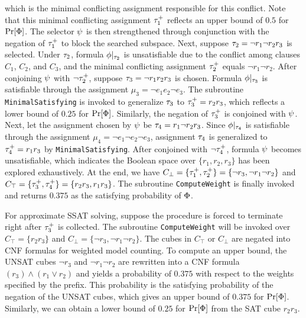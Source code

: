 \begin{example}
    which is the minimal conflicting assignment responsible for this conflict.
    Note that this minimal conflicting assignment $\tau_1^+$ reflects an upper bound of $0.5$ for $\Pr[\Phi]$.
    The selector $\psi$ is then strengthened through conjunction with the negation of $\tau_1^+$ to block the searched subspace.
    Next, suppose $\tau_2=\lnot r_1 \lnot r_2 r_3$ is selected.
    Under $\tau_2$,
    formula $\phi|_{\tau_2}$ is unsatisfiable due to the conflict among clauses $C_1$, $C_2$, and $C_3$,
    and the minimal conflicting assignment $\tau_2^+$ equals $\lnot r_1 \lnot r_2$.
    After conjoining $\psi$ with $\lnot \tau_2^+$, suppose $\tau_3=\lnot r_1 r_2 r_3$ is chosen.
    Formula $\phi|_{\tau_3}$ is satisfiable through the assignment $\mu_3=\lnot e_1 e_2 \lnot e_3$.
    The subroutine \texttt{MinimalSatisfying} is invoked to generalize $\tau_3$ to $\tau_3^+=r_2r_3$,
    which reflects a lower bound of $0.25$ for $\Pr[\Phi]$.
    Similarly, the negation of $\tau_3^+$ is conjoined with $\psi$.
    Next, let the assignment chosen by $\psi$ be $\tau_4=r_1 \lnot r_2 r_3$.
    Since $\phi|_{\tau_4}$ is satisfiable through the assignment $\mu_4=\lnot e_1 \lnot e_2 \lnot e_3$,
    assignment $\tau_4$ is generalized to $\tau_4^+=r_1r_3$ by \texttt{MinimalSatisfying}.
    After conjoined with $\lnot \tau_4^+$,
    formula $\psi$ becomes unsatisfiable,
    which indicates the Boolean space over $\{r_1,r_2,r_3\}$ has been explored exhaustively.
    At the end, we have
    $C_\bot=\{\tau_1^+,\tau_2^+\}=\{\lnot r_3,\lnot r_1 \lnot r_2\}$ and
    $C_\top=\{\tau_3^+,\tau_4^+\}=\{r_2r_3,r_1r_3\}$.
    The subroutine \texttt{ComputeWeight} is finally invoked and returns $0.375$ as the satisfying probability of $\Phi$.

    For approximate SSAT solving, suppose the procedure is forced to terminate right after $\tau_3^+$ is collected.
    The subroutine \texttt{ComputeWeight} will be invoked over $C_\top=\{r_2r_3\}$ and $C_\bot=\{\lnot r_3,\lnot r_1 \lnot r_2\}$.
    The cubes in $C_\top$ or $C_\bot$ are negated into CNF formulas for weighted model counting.
    To compute an upper bound,
    the UNSAT cubes $\lnot r_3$ and $\lnot r_1 \lnot r_2$ are rewritten into a CNF formula $(r_3)\land(r_1 \lor r_2)$ and yields a probability of $0.375$ with respect to the weights specified by the prefix.
    This probability is the satisfying probability of the negation of the UNSAT cubes,
    which gives an upper bound of $0.375$ for $\Pr[\Phi]$.
    Similarly, we can obtain a lower bound of $0.25$ for $\Pr[\Phi]$ from the SAT cube $r_2 r_3$.
\end{example}

